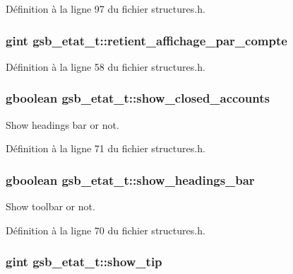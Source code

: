Définition à la ligne 97 du fichier structures.h.

\subsubsection[{retient\_\-affichage\_\-par\_\-compte}]{\setlength{\rightskip}{0pt plus 5cm}gint {\bf gsb\_\-etat\_\-t::retient\_\-affichage\_\-par\_\-compte}}\label{structgsb__etat__t_ae45e10b2c70e5cc3844a13a052ad0d78}


Définition à la ligne 58 du fichier structures.h.

\subsubsection[{show\_\-closed\_\-accounts}]{\setlength{\rightskip}{0pt plus 5cm}gboolean {\bf gsb\_\-etat\_\-t::show\_\-closed\_\-accounts}}\label{structgsb__etat__t_a2bc8b82e44468eaed090b64ef81956f1}
Show headings bar or not. 

Définition à la ligne 71 du fichier structures.h.

\subsubsection[{show\_\-headings\_\-bar}]{\setlength{\rightskip}{0pt plus 5cm}gboolean {\bf gsb\_\-etat\_\-t::show\_\-headings\_\-bar}}\label{structgsb__etat__t_a462b19c31b3d72be181a70d59c9cd5fd}
Show toolbar or not. 

Définition à la ligne 70 du fichier structures.h.

\subsubsection[{show\_\-tip}]{\setlength{\rightskip}{0pt plus 5cm}gint {\bf gsb\_\-etat\_\-t::show\_\-tip}}\label{structgsb__etat__t_a7226554af3f7af0ed91ae5e4120daa5a}


